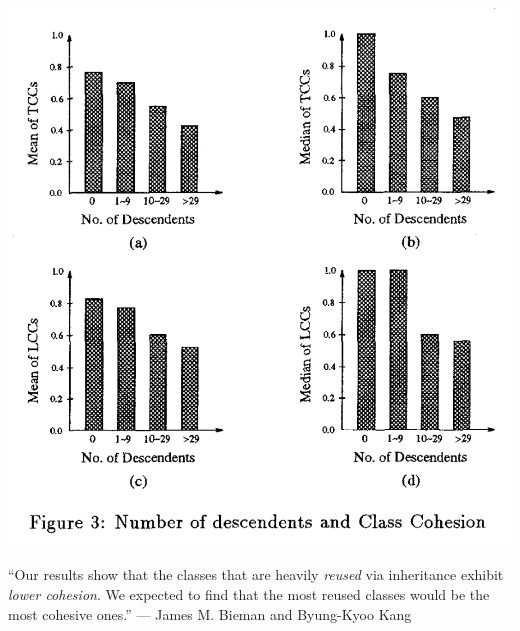 \documentclass{article}
\begin{document}
\begin{multicols}{2}
\includegraphics[width=.9\columnwidth]{graphs.png}
\par\columnbreak\par
``Our results show that the classes that are heavily \emph{reused} via inheritance exhibit \emph{lower cohesion}. We expected to find that the most reused classes would be the most cohesive ones.'' --- James M. Bieman and Byung-Kyoo Kang
\end{multicols}
\plush{}
\end{document}
